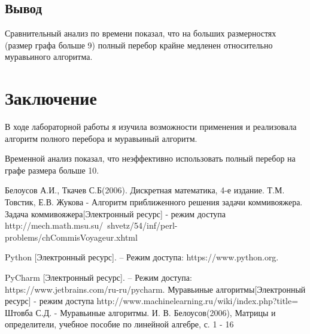 \documentclass[12pt]{report}
\begin{document}
\section*{Вывод}
Сравнительный анализ по времени показал, что на больших размерностях (размер графа больше 9) полный перебор крайне медленен относительно муравьиного алгоритма.



\chapter*{Заключение}
В ходе лабораторной работы я изучила возможности применения и реализовала алгоритм полного перебора и муравьиный алгоритм. 

Временной анализ показал, что неэффективно использовать полный перебор на графе размера больше 10.

\begin{thebibliography}{3}
	 Белоусов А.И., Ткачев С.Б(2006). Дискретная математика, 4-е издание.
	 Т.М. Товстик, Е.В. Жукова - Алгоритм приближенного решения задачи коммивояжера.
	 Задача коммивояжера[Электронный ресурс] - режим доступа http://mech.math.msu.su/~shvetz/54/inf/perl-problems/chCommisVoyageur.xhtml
	\item Python [Электронный ресурс]. – Режим доступа:
	https://www.python.org.
	\item PyCharm [Электронный ресурс]. – Режим доступа:
	https://www.jetbrains.com/ru-ru/pycharm.
	 Муравьиные алгоритмы[Электронный ресурс] - режим доступа http://www.machinelearning.ru/wiki/index.php?title=%
	 Штовба С.Д. - Муравьиные алгоритмы.
	 И. В. Белоусов(2006), Матрицы и определители, учебное пособие по линейной алгебре, с. 1 - 16
\end{thebibliography}
\end{document}
